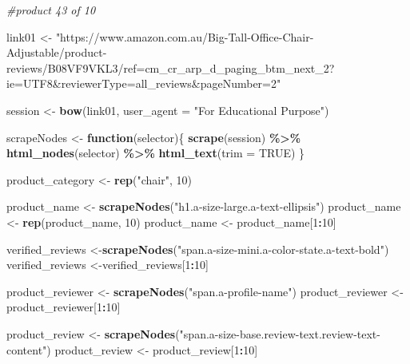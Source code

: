 \documentclass[
]{article}
\newenvironment{Shaded}{\begin{snugshade}}{\end{snugshade}}
\newcommand{\AttributeTok}[1]{\textcolor[rgb]{0.13,0.29,0.53}{#1}}
\newcommand{\CommentTok}[1]{\textcolor[rgb]{0.56,0.35,0.01}{\textit{#1}}}
\newcommand{\ConstantTok}[1]{\textcolor[rgb]{0.56,0.35,0.01}{#1}}
\newcommand{\ControlFlowTok}[1]{\textcolor[rgb]{0.13,0.29,0.53}{\textbf{#1}}}
\newcommand{\DecValTok}[1]{\textcolor[rgb]{0.00,0.00,0.81}{#1}}
\newcommand{\FunctionTok}[1]{\textcolor[rgb]{0.13,0.29,0.53}{\textbf{#1}}}
\newcommand{\NormalTok}[1]{#1}
\newcommand{\OtherTok}[1]{\textcolor[rgb]{0.56,0.35,0.01}{#1}}
\newcommand{\SpecialCharTok}[1]{\textcolor[rgb]{0.81,0.36,0.00}{\textbf{#1}}}
\newcommand{\StringTok}[1]{\textcolor[rgb]{0.31,0.60,0.02}{#1}}
\begin{document}
\begin{Shaded}
\begin{Highlighting}[]
\CommentTok{\#product 43 of 10}

\NormalTok{link01 }\OtherTok{\textless{}{-}} \StringTok{"https://www.amazon.com.au/Big{-}Tall{-}Office{-}Chair{-}Adjustable/product{-}reviews/B08VF9VKL3/ref=cm\_cr\_arp\_d\_paging\_btm\_next\_2?ie=UTF8\&reviewerType=all\_reviews\&pageNumber=2"}


\NormalTok{  session }\OtherTok{\textless{}{-}} \FunctionTok{bow}\NormalTok{(link01,}
               \AttributeTok{user\_agent =} \StringTok{"For Educational Purpose"}\NormalTok{)}

\NormalTok{  scrapeNodes }\OtherTok{\textless{}{-}} \ControlFlowTok{function}\NormalTok{(selector)\{}
    \FunctionTok{scrape}\NormalTok{(session) }\SpecialCharTok{\%\textgreater{}\%}
      \FunctionTok{html\_nodes}\NormalTok{(selector) }\SpecialCharTok{\%\textgreater{}\%}
      \FunctionTok{html\_text}\NormalTok{(}\AttributeTok{trim =} \ConstantTok{TRUE}\NormalTok{)}
\NormalTok{  \}}

\NormalTok{  product\_category }\OtherTok{\textless{}{-}} \FunctionTok{rep}\NormalTok{(}\StringTok{"chair"}\NormalTok{, }\DecValTok{10}\NormalTok{)}

\NormalTok{  product\_name }\OtherTok{\textless{}{-}} \FunctionTok{scrapeNodes}\NormalTok{(}\StringTok{"h1.a{-}size{-}large.a{-}text{-}ellipsis"}\NormalTok{)}
\NormalTok{  product\_name }\OtherTok{\textless{}{-}} \FunctionTok{rep}\NormalTok{(product\_name, }\DecValTok{10}\NormalTok{)}
\NormalTok{  product\_name }\OtherTok{\textless{}{-}}\NormalTok{ product\_name[}\DecValTok{1}\SpecialCharTok{:}\DecValTok{10}\NormalTok{]}
  
\NormalTok{  verified\_reviews }\OtherTok{\textless{}{-}}\FunctionTok{scrapeNodes}\NormalTok{(}\StringTok{"span.a{-}size{-}mini.a{-}color{-}state.a{-}text{-}bold"}\NormalTok{)}
\NormalTok{  verified\_reviews }\OtherTok{\textless{}{-}}\NormalTok{verified\_reviews[}\DecValTok{1}\SpecialCharTok{:}\DecValTok{10}\NormalTok{]}
  
\NormalTok{  product\_reviewer }\OtherTok{\textless{}{-}} \FunctionTok{scrapeNodes}\NormalTok{(}\StringTok{"span.a{-}profile{-}name"}\NormalTok{)}
\NormalTok{  product\_reviewer }\OtherTok{\textless{}{-}}\NormalTok{ product\_reviewer[}\DecValTok{1}\SpecialCharTok{:}\DecValTok{10}\NormalTok{]}
  
\NormalTok{  product\_review }\OtherTok{\textless{}{-}} \FunctionTok{scrapeNodes}\NormalTok{(}\StringTok{"span.a{-}size{-}base.review{-}text.review{-}text{-}content"}\NormalTok{)}
\NormalTok{  product\_review }\OtherTok{\textless{}{-}}\NormalTok{ product\_review[}\DecValTok{1}\SpecialCharTok{:}\DecValTok{10}\NormalTok{]}
  

\end{Highlighting}
\end{Shaded}
\end{document}
